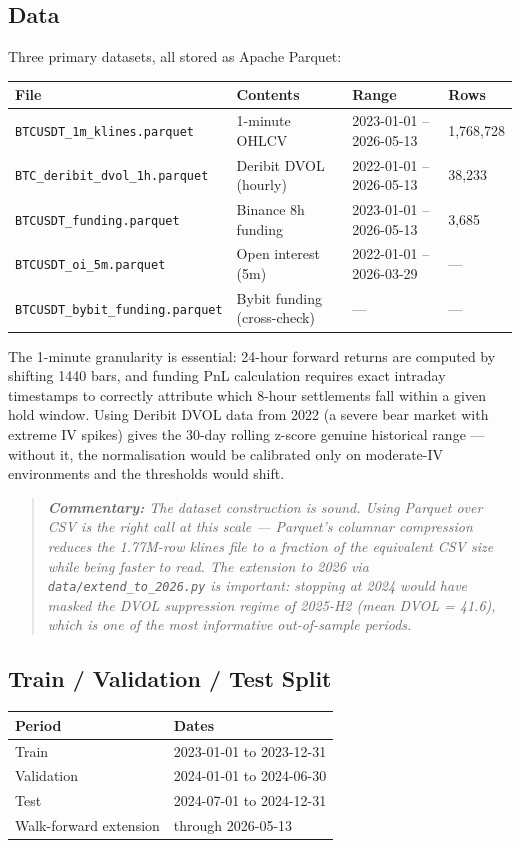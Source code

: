 \documentclass[11pt,a4paper]{article}
\newcommand{\code}[1]{\texttt{#1}}
\newcommand{\comment}[1]{%
  \begin{quote}
    \small\itshape\textbf{Commentary:} #1
  \end{quote}
}
\begin{document}
\subsection{Data}

Three primary datasets, all stored as Apache Parquet:

\begin{longtable}{@{}llll@{}}
\toprule
\textbf{File} & \textbf{Contents} & \textbf{Range} & \textbf{Rows} \\
\midrule
\endhead
\code{BTCUSDT\_1m\_klines.parquet} & 1-minute OHLCV & 2023-01-01 -- 2026-05-13 & 1,768,728 \\
\code{BTC\_deribit\_dvol\_1h.parquet} & Deribit DVOL (hourly) & 2022-01-01 -- 2026-05-13 & 38,233 \\
\code{BTCUSDT\_funding.parquet} & Binance 8h funding & 2023-01-01 -- 2026-05-13 & 3,685 \\
\code{BTCUSDT\_oi\_5m.parquet} & Open interest (5m) & 2022-01-01 -- 2026-03-29 & --- \\
\code{BTCUSDT\_bybit\_funding.parquet} & Bybit funding (cross-check) & --- & --- \\
\bottomrule
\end{longtable}

The 1-minute granularity is essential: 24-hour forward returns are computed by shifting 1440 bars, and funding PnL calculation requires exact intraday timestamps to correctly attribute which 8-hour settlements fall within a given hold window. Using Deribit DVOL data from 2022 (a severe bear market with extreme IV spikes) gives the 30-day rolling z-score genuine historical range --- without it, the normalisation would be calibrated only on moderate-IV environments and the thresholds would shift.

\comment{The dataset construction is sound. Using Parquet over CSV is the right call at this scale --- Parquet's columnar compression reduces the 1.77M-row klines file to a fraction of the equivalent CSV size while being faster to read. The extension to 2026 via \code{data/extend\_to\_2026.py} is important: stopping at 2024 would have masked the DVOL suppression regime of 2025-H2 (mean DVOL = 41.6), which is one of the most informative out-of-sample periods.}

\subsection{Train / Validation / Test Split}

\begin{center}
\begin{tabular}{@{}ll@{}}
\toprule
\textbf{Period} & \textbf{Dates} \\
\midrule
Train & 2023-01-01 to 2023-12-31 \\
Validation & 2024-01-01 to 2024-06-30 \\
Test & 2024-07-01 to 2024-12-31 \\
Walk-forward extension & through 2026-05-13 \\
\bottomrule
\end{tabular}
\end{center}
\end{document}
